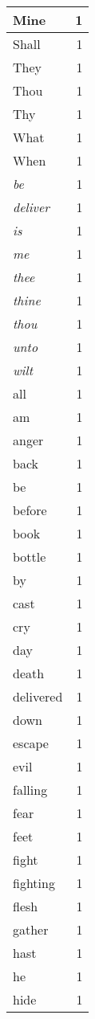 \begin{center}
\begin{longtable}{l|r}
Mine & 1 \\ \hline
Shall & 1 \\ \hline
They & 1 \\ \hline
Thou & 1 \\ \hline
Thy & 1 \\ \hline
What & 1 \\ \hline
When & 1 \\ \hline
\emph{be} & 1 \\ \hline
\emph{deliver} & 1 \\ \hline
\emph{is} & 1 \\ \hline
\emph{me} & 1 \\ \hline
\emph{thee} & 1 \\ \hline
\emph{thine} & 1 \\ \hline
\emph{thou} & 1 \\ \hline
\emph{unto} & 1 \\ \hline
\emph{wilt} & 1 \\ \hline
all & 1 \\ \hline
am & 1 \\ \hline
anger & 1 \\ \hline
back & 1 \\ \hline
be & 1 \\ \hline
before & 1 \\ \hline
book & 1 \\ \hline
bottle & 1 \\ \hline
by & 1 \\ \hline
cast & 1 \\ \hline
cry & 1 \\ \hline
day & 1 \\ \hline
death & 1 \\ \hline
delivered & 1 \\ \hline
down & 1 \\ \hline
escape & 1 \\ \hline
evil & 1 \\ \hline
falling & 1 \\ \hline
fear & 1 \\ \hline
feet & 1 \\ \hline
fight & 1 \\ \hline
fighting & 1 \\ \hline
flesh & 1 \\ \hline
gather & 1 \\ \hline
hast & 1 \\ \hline
he & 1 \\ \hline
hide & 1 \\ \hline

\end{longtable}
\end{center}
